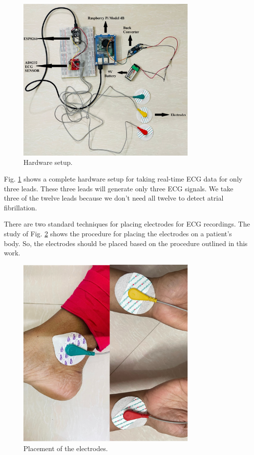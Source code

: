 \documentclass[conference]{IEEEtran}
\begin{document}
\begin{figure}[htbp]
\centerline{\includegraphics[width=3.5in]{2-Hardware Setup.png}}
\caption{Hardware setup.}
\label{fig-2:Hardware Setup.}
\end{figure}

Fig. \ref{fig-2:Hardware Setup.} shows a complete hardware setup for taking real-time ECG data for only three leads. These three leads will generate only three ECG signals. We take three of the twelve leads because we don't need all twelve to detect atrial fibrillation.

There are two standard techniques for placing electrodes for ECG recordings. The study of Fig. \ref{fig-3: Electrodes' Placement.} shows the procedure for placing the electrodes on a patient's body. So, the electrodes should be placed based on the procedure outlined in this work.

\begin{figure}[htbp]
\centerline{\includegraphics[width=3.5in]{3-Electrods' Placement.jpg}}
\caption{Placement of the electrodes.}
\label{fig-3: Electrodes' Placement.}
\end{figure}
\end{document}
